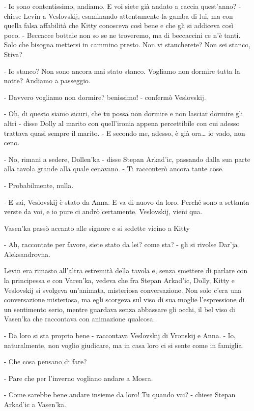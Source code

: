 - Io sono contentissimo, andiamo. E voi siete già andato a caccia quest'anno? - chiese Levin a Veslovskij, esaminando attentamente la gamba di lui, ma con quella falsa affabilità che Kitty conosceva così bene e che gli si addiceva così poco. - Beccacce bottaie non so se ne troveremo, ma di beccaccini ce n'è tanti. Solo che bisogna mettersi in cammino presto. Non vi stancherete? Non sei stanco, Stiva? 

- Io stanco? Non sono ancora mai stato stanco. Vogliamo non dormire tutta la notte? Andiamo a passeggio. 

- Davvero vogliamo non dormire? benissimo! - confermò Veslovskij. 

- Oh, di questo siamo sicuri, che tu possa non dormire e non lasciar dormire gli altri - disse Dolly al marito con quell'ironia appena percettibile con cui adesso trattava quasi sempre il marito. - E secondo me, adesso, è già ora\ldots{} io vado, non ceno. 

- No, rimani a sedere, Dollen'ka - disse Stepan Arkad'ic, passando dalla sua parte alla tavola grande alla quale cenavano. - Ti racconterò ancora tante cose. 

- Probabilmente, nulla. 

- E sai, Veslovskij è stato da Anna. E va di nuovo da loro. Perché sono a settanta verste da voi, e io pure ci andrò certamente. Veslovskij, vieni qua. 

Vasen'ka passò accanto alle signore e si sedette vicino a Kitty 

- Ah, raccontate per favore, siete stato da lei? come sta? - gli si rivolse Dar'ja Aleksandrovna. 

Levin era rimasto all'altra estremità della tavola e, senza smettere di parlare con la principessa e con Varen'ka, vedeva che fra Stepan Arkad'ic, Dolly, Kitty e Veslovskij si svolgeva un'animata, misteriosa conversazione. Non solo c'era una conversazione misteriosa, ma egli scorgeva sul viso di sua moglie l'espressione di un sentimento serio, mentre guardava senza abbassare gli occhi, il bel viso di Vasen'ka che raccontava con animazione qualcosa. 

- Da loro si sta proprio bene - raccontava Veslovskij di Vronskij e Anna. - Io, naturalmente, non voglio giudicare, ma in casa loro ci si sente come in famiglia. 

- Che cosa pensano di fare? 

- Pare che per l'inverno vogliano andare a Mosca. 

- Come sarebbe bene andare insieme da loro! Tu quando vai? - chiese Stepan Arkad'ic a Vasen'ka. 


